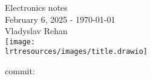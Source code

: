 





\begin{titlepage}
	\vspace*{\fill}
	\begin{center}
		\Huge
		Electronics notes\\
		\vspace{1cm}
		\Large
		February 6, 2025 - \today\\
		\large
		Vladyslav Rehan\\
		\vspace*{4cm}
		\texttt{[image: \\lrtresources/images/title.drawio]}
		\vspace*{5cm}
	\end{center}
	\vspace*{\fill}
	\begin{raggedleft}
		\footnotesize commit: \href{\elnthomepage}{\texttt{\elntcommithash}}
	\end{raggedleft}
\end{titlepage}

\tableofcontents





\printbibliography


